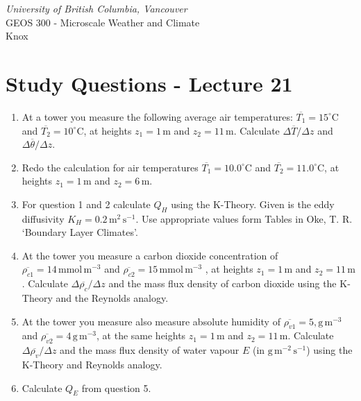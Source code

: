 \documentclass[11pt]{article}
\author{Andy Black and Andreas Christen}
\begin{document}
\begin{center}
\emph{University of British Columbia, Vancouver}\\
GEOS 300 - Microscale Weather and Climate\\
Knox
\section*{Study Questions - Lecture 21}
\end{center}

\begin{enumerate}

\item At a tower you measure the following average air temperatures: $\overline{T_1} = 15^{\circ}\textrm{C}$ and $\overline{T_2} = 10^{\circ}\textrm{C}$, at heights $z_1 = 1\,\textrm{m}$ and $z_2 = 11\,\textrm{m}$. Calculate $\Delta \overline{T} / \Delta z$ and  $\Delta \overline{\theta} / \Delta z$.

\item Redo the calculation for air temperatures $\overline{T_1} = 10.0^{\circ}\textrm{C}$ and $\overline{T_2} = 11.0^{\circ}\textrm{C}$, at heights $z_1 = 1\,\textrm{m}$ and $z_2 = 6\,\textrm{m}$.

\item For question 1 and 2 calculate $Q_H$ using the K-Theory. Given is the eddy diffusivity $K_H = 0.2\,\textrm{m}^{2}\,\textrm{s}^{-1}$. Use appropriate values form Tables in Oke, T. R. `Boundary Layer Climates'.

\item At the tower you measure a carbon dioxide concentration of $\overline{\rho_{c1}} = 14\,\textrm{mmol}\,\textrm{m}^{-3}$ and $\overline{\rho_{c2}} = 15\,\textrm{mmol}\,\textrm{m}^{-3}$ , at heights $z_1 = 1\,\textrm{m}$ and $z_2 = 11\,\textrm{m}$. Calculate $\Delta \overline{\rho_{c}} / \Delta z$ and the mass flux density of carbon dioxide using the K-Theory and the Reynolds analogy.

\item At the tower you measure also measure absolute humidity of $\overline{\rho_{v1}} = 5,\textrm{g}\,\textrm{m}^{-3}$ and $\overline{\rho_{v2}} = 4\,\textrm{g}\,\textrm{m}^{-3}$, at the same heights $z_1 = 1\,\textrm{m}$ and $z_2 = 11\,\textrm{m}$. Calculate $\Delta \overline{\rho_{v}} / \Delta z$ and the mass flux density of water vapour $E$ (in $\textrm{g}\,\textrm{m}^{-2}\,\textrm{s}^{-1}$) using the K-Theory and Reynolds analogy.

\item Calculate $Q_E$ from question 5.

\end{enumerate}

\noindent
\end{document}
